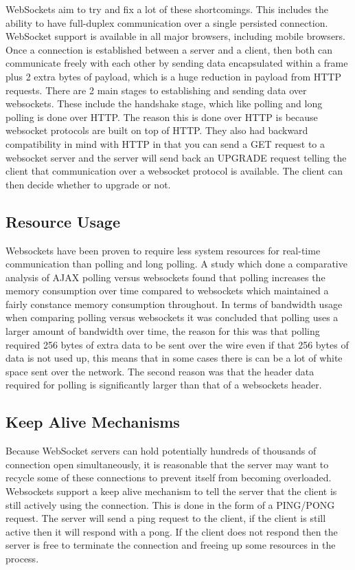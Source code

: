 WebSockets aim to try and fix a lot of these shortcomings. This includes the ability to have full-duplex communication over a single persisted connection. WebSocket support is available in all major browsers, including mobile browsers. Once a connection is established between a server and a client, then both can communicate freely with each other by sending data encapsulated within a frame plus 2 extra bytes of payload, which is a huge reduction in payload from HTTP requests. There are 2 main stages to establishing and sending data over websockets. These include the handshake stage, which like polling and long polling is done over HTTP. The reason this is done over HTTP is because websocket protocols are built on top of HTTP. They also had backward compatibility in mind with HTTP in that you can send a GET request to a websocket server and the server will send back an UPGRADE request telling the client that communication over a websocket protocol is available. The client can then decide whether to upgrade or not.

\subsection{Resource Usage}

Websockets have been proven to require less system resources for real-time communication than polling and long polling. A study which done a comparative analysis of AJAX polling versus websockets found that polling increases the memory consumption over time compared to websockets which maintained a fairly constance memory consumption throughout\cite{6601579}. In terms of bandwidth usage when comparing polling versus websockets it was concluded that polling uses a larger amount of bandwidth over time, the reason for this was that polling required 256 bytes of extra data to be sent over the wire even if that 256 bytes of data is not used up, this means that in some cases there is can be a lot of white space sent over the network. The second reason was that the header data required for polling is significantly larger than that of a websockets header\cite{6601579}.

\subsection{Keep Alive Mechanisms}

Because WebSocket servers can hold potentially hundreds of thousands of connection open simultaneously, it is reasonable that the server may want to recycle some of these connections to prevent itself from becoming overloaded. Websockets support a keep alive mechanism to tell the server that the client is still actively using the connection. This is done in the form of a PING/PONG request. The server will send a ping request to the client, if the client is still active then it will respond with a pong. If the client does not respond then the server is free to terminate the connection and freeing up some resources in the process. 

